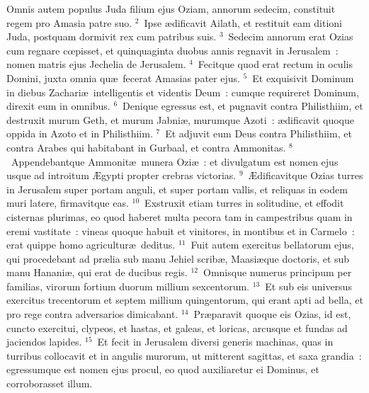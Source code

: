 \bchapter
\lettrine[lines=3,image=true,loversize=0.05,lraise=-0.03]{O}{}mnis autem populus Juda filium ejus Oziam, annorum sedecim, constituit regem pro Amasia patre suo.
${}^{2}$~Ipse \ae dificavit Ailath, et restituit eam ditioni Juda, postquam dormivit rex cum patribus suis.
${}^{3}$~Sedecim annorum erat Ozias cum regnare cœpisset, et quinquaginta duobus annis regnavit in Jerusalem~: nomen matris ejus Jechelia de Jerusalem.
${}^{4}$~Fecitque quod erat rectum in oculis Domini, juxta omnia qu\ae\ fecerat Amasias pater ejus.
${}^{5}$~Et exquisivit Dominum in diebus Zachari\ae\ intelligentis et videntis Deum~: cumque requireret Dominum, direxit eum in omnibus.
${}^{6}$~Denique egressus est, et pugnavit contra Philisthiim, et destruxit murum Geth, et murum Jabni\ae , murumque Azoti~: \ae dificavit quoque oppida in Azoto et in Philisthiim.
${}^{7}$~Et adjuvit eum Deus contra Philisthiim, et contra Arabes qui habitabant in Gurbaal, et contra Ammonitas.
${}^{8}$~Appendebantque Ammonit\ae\ munera Ozi\ae~: et divulgatum est nomen ejus usque ad introitum \AE gypti propter crebras victorias.
${}^{9}$~\AE dificavitque Ozias turres in Jerusalem super portam anguli, et super portam vallis, et reliquas in eodem muri latere, firmavitque eas.
${}^{10}$~Exstruxit etiam turres in solitudine, et effodit cisternas plurimas, eo quod haberet multa pecora tam in campestribus quam in eremi vastitate~: vineas quoque habuit et vinitores, in montibus et in Carmelo~: erat quippe homo agricultur\ae\ deditus.
${}^{11}$~Fuit autem exercitus bellatorum ejus, qui procedebant ad pr\ae lia sub manu Jehiel scrib\ae , Maasi\ae que doctoris, et sub manu Hanani\ae , qui erat de ducibus regis.
${}^{12}$~Omnisque numerus principum per familias, virorum fortium duorum millium sexcentorum.
${}^{13}$~Et sub eis universus exercitus trecentorum et septem millium quingentorum, qui erant apti ad bella, et pro rege contra adversarios dimicabant.
${}^{14}$~Pr\ae paravit quoque eis Ozias, id est, cuncto exercitui, clypeos, et hastas, et galeas, et loricas, arcusque et fundas ad jaciendos lapides.
${}^{15}$~Et fecit in Jerusalem diversi generis machinas, quas in turribus collocavit et in angulis murorum, ut mitterent sagittas, et saxa grandia~: egressumque est nomen ejus procul, eo quod auxiliaretur ei Dominus, et corroborasset illum.



